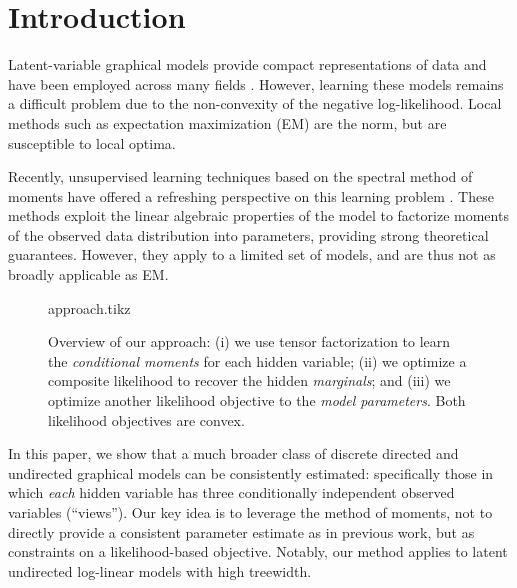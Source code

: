 \section{Introduction}
\label{sec:introduction}

Latent-variable graphical models provide compact representations of data
and have been employed across many fields %
\cite{ghahramani1999variational,jaakkola1999variational,blei03lda,quattoni04crf,haghighi06prototype}.
However, learning these models remains a difficult problem due to the
non-convexity of the negative log-likelihood.  Local methods such as expectation maximization (EM)
are the norm, but are susceptible to local optima.

Recently, unsupervised learning techniques based on the spectral method of moments
have offered a refreshing perspective on
this learning problem
\citep{mossel2005learning,
hsu09spectral,
bailly2010spectral,
song2011spectral,
anandkumar11tree,
anandkumar12lda,
anandkumar12moments,
hsu12identifiability,
balle12automata}.
These methods exploit the linear algebraic properties of the model to
factorize moments of the observed data distribution into parameters,
providing strong theoretical guarantees.
However, they apply to a limited set of models, and are thus
not as broadly applicable as EM.

\begin{figure}[t]
  \label{fig:approach}
  \centering
  {approach.tikz}
  \caption{
  Overview of our approach:
  (i) we use tensor factorization to learn the \emph{conditional moments}
  for each hidden variable;
  (ii) we optimize a composite likelihood to recover the hidden \emph{marginals};
  and (iii) we optimize another likelihood objective to the \emph{model parameters}.
  Both likelihood objectives are convex.
  }
\end{figure}


In this paper,
we show that a much broader class of discrete directed and undirected graphical
models can be consistently estimated:
specifically those in which \emph{each} hidden variable has three conditionally
independent observed variables (``views'').
Our key idea is to leverage the method of moments,
not to directly provide a consistent parameter estimate as in previous work,
but as constraints on a likelihood-based objective.
Notably, our method applies to latent undirected log-linear models with high treewidth.

